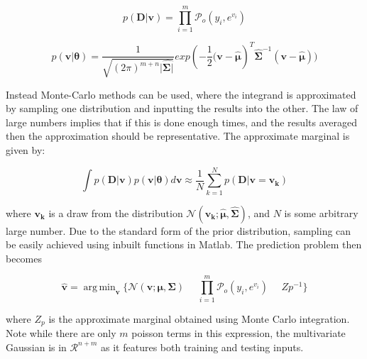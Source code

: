 \documentclass[a4paper,11pt]{report}
\DeclareMathOperator*{\argmin}{arg\,min}
\begin{document}
\singlespacing
\begin{equation} \label{eq:LCGPinflik}
p(\mathbf{D|v}) = \prod_{i=1}^{m} \mathcal{P}_o (y_i, e^{v_i})
\end{equation}

\begin{equation}
p(\mathbf{v}|\boldsymbol{\theta}) = \frac{1}{\sqrt{(2\pi)^{m+n} |\hat{\boldsymbol{\Sigma|}}}} exp(- \frac{1}{2} \mathbf{(v}-\hat{\boldsymbol{\mu}})^{T}\hat{\boldsymbol{\Sigma}}^{-1}(\mathbf{v}-\hat{\boldsymbol{\mu}}))
\end{equation}
\doublespacing


Instead Monte-Carlo methods can be used, where the integrand is approximated by sampling one distribution and inputting the results into the other. The law of large numbers implies that if this is done enough times, and the results averaged then the approximation should be representative. The approximate marginal is given by:

\begin{equation}
\int{p(\mathbf{D|v})p(\mathbf{v}|\boldsymbol{\theta}) d\mathbf{v}} \approx \frac{1}{N} \displaystyle \sum_{k=1}^{N} p(\mathbf{D|v=v_k})
\end{equation}

where \(\mathbf{v_k}\) is a draw from the distribution \(\mathcal{N}(\mathbf{v_k};\hat{\boldsymbol{\mu}},\hat{\boldsymbol{\Sigma}})\), and \(N\) is some arbitrary large number. Due to the standard form of the prior distribution, sampling can be easily achieved using inbuilt functions in Matlab. The prediction problem then becomes 

\begin{equation}
\hat{\mathbf{v}} = \argmin_\mathbf{v}{\{  \mathcal{N}(\mathbf{v};\boldsymbol{\mu, \Sigma}) \text{  }\text{  } \displaystyle \prod_{i=1}^{m} \mathcal{P}_o (y_i, e^{v_i}) \text{  }\text{  } Zp^{-1} } \}
\end{equation}

where \(Z_p\) is the approximate marginal obtained using Monte Carlo integration. Note while there are only \(m\) poisson terms in this expression, the multivariate Gaussian is in \(\mathcal{R}^{n+m}\) as it features both training and testing inputs. \par
\end{document}
